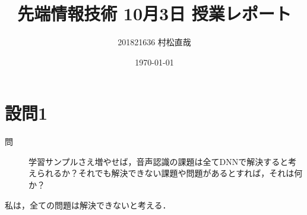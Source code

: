 \documentclass[uplatex,a4paper]{jsarticle}
\title{先端情報技術 10月3日 授業レポート}
\author{201821636 村松直哉}
\date{\today}
\begin{document}
\maketitle
%
%
\section{設問1}
\begin{description}
 \item[問] 学習サンプルさえ増やせば，音声認識の課題は全てDNNで解決すると考えられるか？それでも解決できない課題や問題があるとすれば，それは何か？
\end{description}

私は，全ての問題は解決できないと考える．
\end{document}
